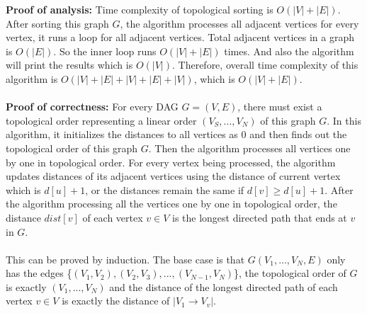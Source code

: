 \documentclass[11pt]{article}
\theoremstyle{definition}
\begin{document}
\begin{enumerate}

\textbf{Proof of analysis:} Time complexity of topological sorting is $O(|V|+|E|)$. After sorting this graph $G$, the algorithm processes all adjacent vertices for every vertex, it runs a loop for all adjacent vertices. Total adjacent vertices in a graph is $O(|E|)$. So the inner loop runs $O(|V|+|E|)$ times. And also the algorithm will print the results which is $O(|V|)$. Therefore, overall time complexity of this algorithm is $O(|V|+|E|+|V|+|E|+|V|)$, which is $O(|V|+|E|)$.\\
\\
\textbf{Proof of correctness:} For every DAG $G=(V, E)$, there must exist a topological order representing a linear order $(V_S, ..., V_N)$ of this graph $G$. In this algorithm, it initializes the distances to all vertices as 0 and then finds out the topological order of this graph $G$. Then the algorithm processes all vertices one by one in topological order. For every vertex being processed, the algorithm updates distances of its adjacent vertices using the distance of current vertex which is $d[u]+1$, or the distances remain the same if $d[v] \ge d[u]+1$. After the algorithm processing all the vertices one by one in topological order, the distance $dist[v]$ of each vertex $v \in V$ is the longest directed path that ends at $v$ in $G$. \\\\ This can be proved by induction. The base case is that $G(V_1,...,V_N, E)$ only has the edges \{$(V_1,V_2), (V_2,V_3),...,(V_{N-1},V_N)$\}, the topological order of $G$ is exactly $(V_1,...,V_N)$ and the distance of the longest directed path of each vertex $v \in V$ is exactly the distance of $|V_1 \to V_v|$. 


\end{enumerate}
\end{document}

